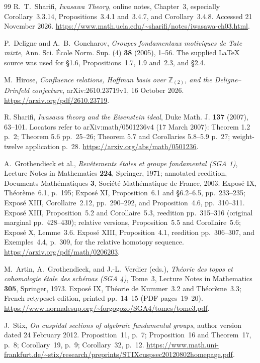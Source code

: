 \documentclass[11pt,a4paper]{article}
\theoremstyle{definition}
\begin{document}
\begin{thebibliography}{99}
R.~T.~Sharifi, \emph{Iwasawa Theory}, online notes, Chapter~3,
especially Corollary~3.3.14, Propositions~3.4.1 and~3.4.7,
and Corollary~3.4.8. Accessed 21 November 2026.
\url{https://www.math.ucla.edu/~sharifi/notes/iwasawa-ch03.html}.


P.~Deligne and A.~B.~Goncharov,
\emph{Groupes fondamentaux motiviques de Tate mixte},
Ann. Sci. \'Ecole Norm. Sup. (4) \textbf{38} (2005), 1--56.
The supplied LaTeX source was used for \S1.6,
Propositions~1.7, 1.9 and~2.3, and \S2.4.


M.~Hirose, \emph{Confluence relations, Hoffman basis over $\mathbb Z_{(2)}$,
and the Deligne--Drinfeld conjecture},
arXiv:2610.23719v1, 16 October 2026.
\url{https://arxiv.org/pdf/2610.23719}.


 R. Sharifi, \emph{Iwasawa theory and the Eisenstein ideal}, Duke Math. J. \textbf{137} (2007), 63--101. Locators refer to arXiv:math/0501236v4 (17 March 2007): Theorem 1.2 p.~2; Theorem 5.6 pp.~25--26; Theorem 5.7 and Corollaries 5.8--5.9 p.~27; weight-twelve application p.~28. \url{https://arxiv.org/abs/math/0501236}.

A.~Grothendieck et al., \emph{Rev\^etements \'etales et groupe fondamental
(SGA 1)}, Lecture Notes in Mathematics \textbf{224}, Springer, 1971;
annotated reedition, Documents Math\'ematiques \textbf{3},
Soci\'et\'e Math\'ematique de France, 2003.
Expos\'e IX, Th\'eor\`eme~6.1, p.~195;
Expos\'e XI, Proposition~6.1 and \S6.2--6.5, pp.~233--235;
Expos\'e XIII, Corollaire~2.12, pp.~290--292,
and Proposition~4.6, pp.~310--311.
Expos\'e XIII, Proposition~5.2 and Corollaire~5.3,
reedition pp.~315--316 (original marginal pp.~428--430);
relative versions, Proposition~5.5 and Corollaire~5.6;
Expos\'e X, Lemme~3.6.
Expos\'e XIII, Proposition~4.1, reedition pp.~306--307,
and Exemples~4.4, p.~309, for the relative homotopy sequence.
\url{https://arxiv.org/pdf/math/0206203}.


M.~Artin, A.~Grothendieck, and J.-L.~Verdier (eds.),
\emph{Th\'eorie des topos et cohomologie \'etale des sch\'emas
(SGA 4)}, Tome~3, Lecture Notes in Mathematics \textbf{305},
Springer, 1973. Expos\'e IX, Th\'eorie de Kummer~3.2 and
Th\'eor\`eme~3.3; French retypeset edition, printed pp.~14--15
(PDF pages~19--20).
\url{https://www.normalesup.org/~forgogozo/SGA4/tomes/tome3.pdf}.


J.~Stix, \emph{On cuspidal sections of algebraic fundamental groups},
author version dated 24 February 2012.
Proposition~11, p.~7; Proposition~16 and Theorem~17, p.~8;
Corollary~19, p.~9; Corollary~32, p.~12.
\url{https://www.math.uni-frankfurt.de/~stix/research/preprints/STIXcuspsec20120802homepage.pdf}.



\end{thebibliography}
\end{document}
